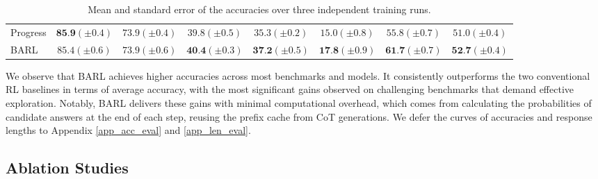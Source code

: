 \begin{table}[ht]
\begin{tabular}{l|ccccccc}
\quad Progress  & $\textbf{85.9}\scriptstyle(\pm0.4)$ & $73.9\scriptstyle(\pm0.4)$ & $39.8\scriptstyle(\pm0.5)$ & $35.3\scriptstyle(\pm0.2)$ & $15.0\scriptstyle(\pm0.8)$ & $55.8\scriptstyle(\pm0.7)$ & $51.0\scriptstyle(\pm0.4)$\\
\quad BARL  & $85.4\scriptstyle(\pm0.6)$ & $73.9\scriptstyle(\pm0.6)$ & $\textbf{40.4}\scriptstyle(\pm0.3)$ & $\textbf{37.2}\scriptstyle(\pm0.5)$ & $\textbf{17.8}\scriptstyle(\pm0.9)$ & $\textbf{61.7}\scriptstyle(\pm0.7)$ & $\textbf{52.7}\scriptstyle(\pm0.4)$  \\
\hline
\end{tabular}
\caption{Mean and standard error of the accuracies over three independent training runs.}
\label{tab_perf}
\end{table}

We observe that BARL achieves higher accuracies across most benchmarks and models. It consistently outperforms the two conventional RL baselines in terms of average accuracy, with the most significant gains observed on challenging benchmarks that demand effective exploration. Notably, BARL delivers these gains with minimal computational overhead, which comes from calculating the probabilities of candidate answers at the end of each step, reusing the prefix cache from CoT generations. We defer the curves of accuracies and response lengths to Appendix \ref{app_acc_eval} and \ref{app_len_eval}.

\subsection{Ablation Studies}\label{sec_ablation}
